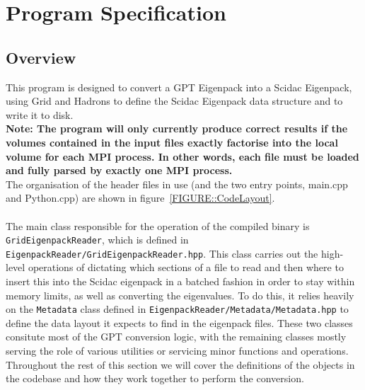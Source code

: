\documentclass{article}
\begin{document}
\clearpage
\section{Program Specification}
\subsection{Overview}
This program is designed to convert a GPT Eigenpack into a Scidac Eigenpack, using Grid and Hadrons to define the Scidac Eigenpack data structure and to write it to disk.\\
\textbf{Note: The program will only currently produce correct results if the volumes contained in the input files exactly factorise into the local volume for each MPI process. In other words, each file must be loaded and fully parsed by exactly one MPI process.}\\
The organisation of the header files in use (and the two entry points, main.cpp and Python.cpp) are shown in figure~\ref{FIGURE::CodeLayout}.\\\\
\noindent
The main class responsible for the operation of the compiled binary is \\\texttt{GridEigenpackReader}, which is defined in \\\texttt{EigenpackReader/GridEigenpackReader.hpp}. This class carries out the high-level operations of dictating which sections of a file to read and then where to insert this into the Scidac eigenpack in a batched fashion in order to stay within memory limits, as well as converting the eigenvalues. To do this, it relies heavily on the \texttt{Metadata} class defined in \texttt{EigenpackReader/Metadata/Metadata.hpp} to define the data layout it expects to find in the eigenpack files. These two classes consitute most of the GPT conversion logic, with the remaining classes mostly serving the role of various utilities or servicing minor functions and operations. Throughout the rest of this section we will cover the definitions of the objects in the codebase and how they work together to perform the conversion.
\end{document}
